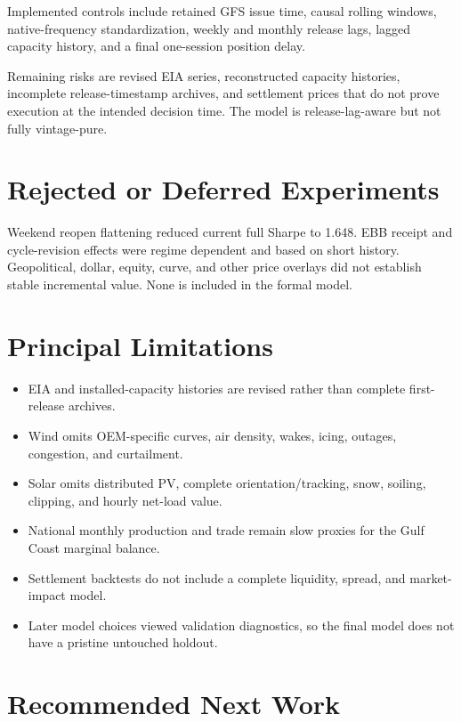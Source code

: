 \documentclass[11pt,a4paper]{article}
\begin{document}
Implemented controls include retained GFS issue time, causal rolling windows,
native-frequency standardization, weekly and monthly release lags, lagged
capacity history, and a final one-session position delay.

Remaining risks are revised EIA series, reconstructed capacity histories,
incomplete release-timestamp archives, and settlement prices that do not prove
execution at the intended decision time. The model is release-lag-aware but not
fully vintage-pure.

\section{Rejected or Deferred Experiments}

Weekend reopen flattening reduced current full Sharpe to 1.648. EBB receipt and
cycle-revision effects were regime dependent and based on short history.
Geopolitical, dollar, equity, curve, and other price overlays did not establish
stable incremental value. None is included in the formal model.

\section{Principal Limitations}

\begin{itemize}
  \item EIA and installed-capacity histories are revised rather than complete
        first-release archives.
  \item Wind omits OEM-specific curves, air density, wakes, icing, outages,
        congestion, and curtailment.
  \item Solar omits distributed PV, complete orientation/tracking, snow,
        soiling, clipping, and hourly net-load value.
  \item National monthly production and trade remain slow proxies for the Gulf
        Coast marginal balance.
  \item Settlement backtests do not include a complete liquidity, spread, and
        market-impact model.
  \item Later model choices viewed validation diagnostics, so the final model
        does not have a pristine untouched holdout.
\end{itemize}

\section{Recommended Next Work}
\end{document}
